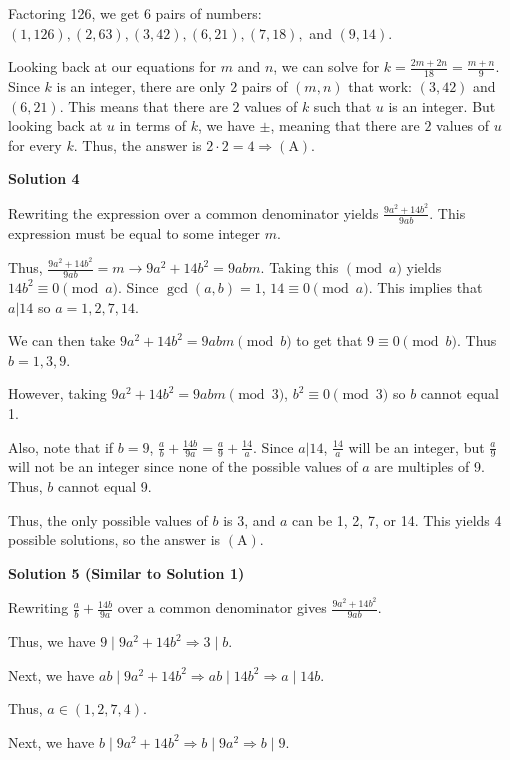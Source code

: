 \begin{enumerate}
 Factoring 126, we get $6$ pairs of numbers: $(1,126), (2,63), (3,42), (6,21), (7,18),$ and $(9,14)$.

 Looking back at our equations for $m$ and $n$, we can solve for $k = \frac{2m + 2n}{18} = \frac{m+n}{9}$. Since $k$ is an integer, there are only $2$ pairs of $(m,n)$ that work: $(3,42)$ and $(6,21)$. This means that there are $2$ values of $k$ such that $u$ is an integer. But looking back at $u$ in terms of $k$, we have $\pm$, meaning that there are $2$ values of $u$ for every $k$. Thus, the answer is $2 \cdot 2 = 4 \Rightarrow \mathrm{(A)}$.

 



\textbf{Solution 4}

Rewriting the expression over a common denominator yields $\frac{9a^2 + 14b^2}{9ab}$. This expression must be equal to some integer $m$.

 Thus, $\frac{9a^2 + 14b^2}{9ab} = m \rightarrow 9a^2 + 14b^2 = 9abm$. Taking this $\pmod{a}$ yields $14b^2 \equiv 0\pmod{a}$. Since $\gcd(a,b)=1$, $14 \equiv 0\pmod{a}$. This implies that $a|14$ so $a = 1, 2, 7, 14$.

 We can then take $9a^2 + 14b^2 = 9abm \pmod{b}$ to get that $9 \equiv 0 \pmod{b}$. Thus $b = 1, 3, 9$.

 However, taking $9a^2 + 14b^2 = 9abm \pmod{3}$, $b^2 \equiv 0\pmod{3}$ so $b$ cannot equal 1.

 Also, note that if $b = 9$,  $\frac{a}{b}+\frac{14b}{9a} = \frac{a}{9}+\frac{14}{a}$. Since $a|14$, $\frac{14}{a}$ will be an integer, but $\frac{a}{9}$ will not be an integer since none of the possible values of $a$ are multiples of 9. Thus, $b$ cannot equal 9.

 Thus, the only possible values of $b$ is 3, and $a$ can be 1, 2, 7, or 14. This yields 4 possible solutions, so the answer is $\mathrm{(A)}$.

 



\textbf{Solution 5 (Similar to Solution 1)}

Rewriting $\frac{a}{b} + \frac{14b}{9a}$ over a common denominator gives $\frac{9a^2 + 14b^2}{9ab}.$

 Thus, we have $9 \mid 9a^2 + 14b^2 \Rightarrow  3 \mid b.$

 Next, we have $ab \mid 9a^2+14b^2 \Rightarrow  ab \mid 14b^2 \Rightarrow a \mid 14b.$

 Thus, $a \in (1,2,7,4).$ 

 Next, we have $b \mid 9a^2 + 14b^2 \Rightarrow b \mid 9a^2 \Rightarrow b \mid 9.$


\end{enumerate}
